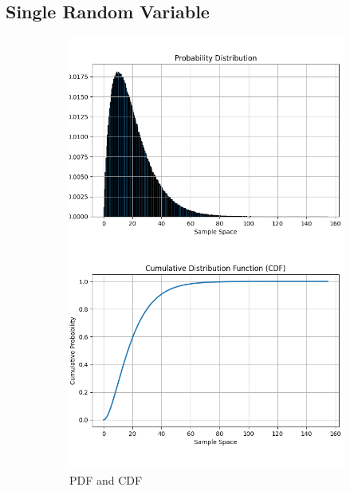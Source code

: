 \documentclass{article}
\begin{document}
\subsection{Single Random Variable}
\begin{figure}[H]
  \centering
  \begin{subfigure}{0.45\textwidth}
    \centering
    \includegraphics[width=\linewidth]{results/section1/a1(1).png}
    \caption{PDF and CDF}
  \end{subfigure}
  \hfill
  \begin{subfigure}{0.45\textwidth}
    \centering

\end{subfigure}
\end{figure}
\end{document}
